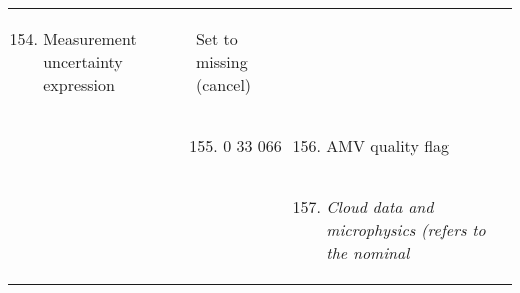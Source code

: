 \begin{longtable}[]{@{}llll@{}}
\begin{minipage}[t]{0.22\columnwidth}
\begin{enumerate}
\setcounter{enumi}{153}
\item
  Measurement uncertainty expression
\end{enumerate}\strut
\end{minipage} & \begin{minipage}[t]{0.22\columnwidth}\raggedright
Set to missing (cancel)\strut
\end{minipage}\tabularnewline
\begin{minipage}[t]{0.22\columnwidth}\raggedright
\strut
\end{minipage} & \begin{minipage}[t]{0.22\columnwidth}\raggedright
\begin{enumerate}
\setcounter{enumi}{154}
\item
  0 33 066
\end{enumerate}\strut
\end{minipage} & \begin{minipage}[t]{0.22\columnwidth}\raggedright
\begin{enumerate}
\setcounter{enumi}{155}
\item
  AMV quality flag
\end{enumerate}\strut
\end{minipage} & \begin{minipage}[t]{0.22\columnwidth}\raggedright
\strut
\end{minipage}\tabularnewline
\begin{minipage}[t]{0.22\columnwidth}\raggedright
\strut
\end{minipage} & \begin{minipage}[t]{0.22\columnwidth}\raggedright
\strut
\end{minipage} & \begin{minipage}[t]{0.22\columnwidth}\raggedright
\begin{enumerate}
\setcounter{enumi}{156}
\item
  \emph{Cloud data and microphysics (refers to the nominal}


\end{enumerate}
\end{minipage}
\end{longtable}
